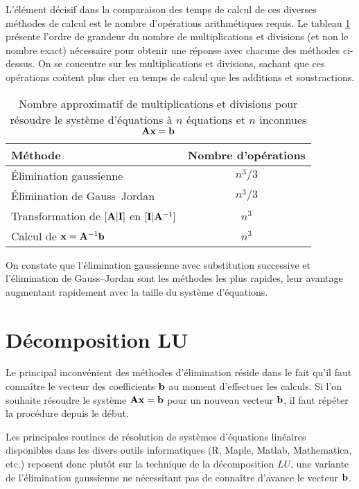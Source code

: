 L'élément décisif dans la comparaison des temps de calcul de ces
diverses méthodes de calcul est le nombre d'opérations arithmétiques
requis. Le tableau \ref{tab:decomposition:nb_oper} présente l'ordre de
grandeur du nombre de multiplications et divisions (et non le nombre
exact) nécessaire pour obtenir une réponse avec chacune des méthodes
ci-dessus. On se concentre sur les multiplications et divisions,
sachant que ces opérations coûtent plus cher en temps de calcul que
les additions et soustractions.
\begin{table}
  \centering
  \begin{tabular}{lc}
    \toprule
    Méthode & Nombre d'opérations \\
    \midrule
    Élimination gaussienne & $n^3/3$ \\
    Élimination de Gauss--Jordan & $n^3/3$ \\
    Transformation de $[\mathbf{A}|\mathbf{I}]$ en $[\mathbf{I}|\mathbf{A}^{-1}]$ &
    $n^3$ \\
    Calcul de $\mathbf{x} = \mathbf{A}^{-1} \mathbf{b}$ & $n^3$ \\
    \bottomrule
  \end{tabular}
  \caption{Nombre approximatif de multiplications et divisions pour
    résoudre le système d'équations à $n$ équations et $n$ inconnues
    $\mathbf{A} \mathbf{x} = \mathbf{b}$}
  \label{tab:decomposition:nb_oper}
\end{table}

On constate que l'élimination gaussienne avec substitution successive
et l'élimination de Gauss--Jordan sont les méthodes les plus rapides,
leur avantage augmentant rapidement avec la taille du système
d'équations.


\section{Décomposition LU}
\label{sec:decomposition:decomposition}

Le principal inconvénient des méthodes d'élimination réside dans le
fait qu'il faut connaître le vecteur des coefficients $\mathbf{b}$ au
moment d'effectuer les calculs. Si l'on souhaite résoudre le système
$\mathbf{Ax} = \mathbf{b}$ pour un nouveau vecteur $\mathbf{b}$, il faut
répéter la procédure depuis le début.

Les principales routines de résolution de systèmes d'équations
linéaires disponibles dans les divers outils informatiques (R, Maple,
Matlab, Mathematica, etc.) reposent donc plutôt sur la technique de la
décomposition $LU$, une variante de l'élimination gaussienne ne
nécessitant pas de connaître d'avance le vecteur $\mathbf{b}$.

